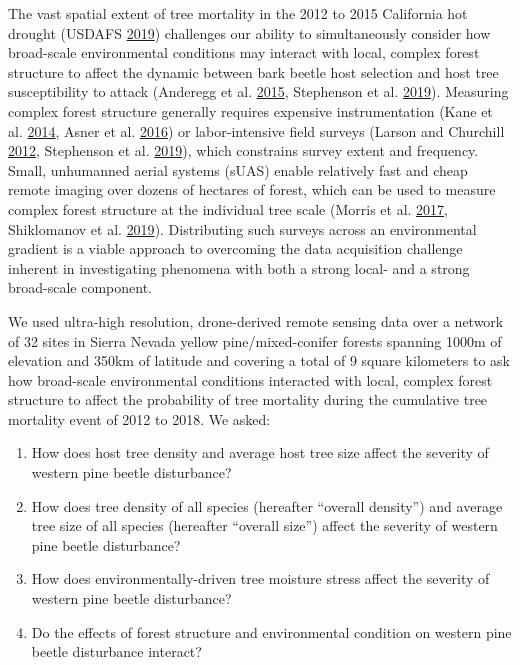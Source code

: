 \documentclass[twoside,12pt,final]{ucthesis-CA2012}
\begin{document}
\begin{ucmainmatter}
The vast spatial extent of tree mortality in the 2012 to 2015 California
hot drought (USDAFS \protect\hyperlink{ref-usdafs2019}{2019}) challenges
our ability to simultaneously consider how broad-scale environmental
conditions may interact with local, complex forest structure to affect
the dynamic between bark beetle host selection and host tree
susceptibility to attack (Anderegg et al.
\protect\hyperlink{ref-anderegg2015a}{2015}, Stephenson et al.
\protect\hyperlink{ref-stephenson2019}{2019}). Measuring complex forest
structure generally requires expensive instrumentation (Kane et al.
\protect\hyperlink{ref-kane2014}{2014}, Asner et al.
\protect\hyperlink{ref-asner2016}{2016}) or labor-intensive field
surveys (Larson and Churchill \protect\hyperlink{ref-larson2012}{2012},
Stephenson et al. \protect\hyperlink{ref-stephenson2019}{2019}), which
constrains survey extent and frequency. Small, unhumanned aerial systems
(sUAS) enable relatively fast and cheap remote imaging over dozens of
hectares of forest, which can be used to measure complex forest
structure at the individual tree scale (Morris et al.
\protect\hyperlink{ref-morris2017}{2017}, Shiklomanov et al.
\protect\hyperlink{ref-shiklomanov2019}{2019}). Distributing such
surveys across an environmental gradient is a viable approach to
overcoming the data acquisition challenge inherent in investigating
phenomena with both a strong local- and a strong broad-scale component.

We used ultra-high resolution, drone-derived remote sensing data over a
network of 32 sites in Sierra Nevada yellow pine/mixed-conifer forests
spanning 1000m of elevation and 350km of latitude and covering a total
of 9 square kilometers to ask how broad-scale environmental conditions
interacted with local, complex forest structure to affect the
probability of tree mortality during the cumulative tree mortality event
of 2012 to 2018. We asked:
\begin{enumerate}
\def\labelenumi{\arabic{enumi}.}
\item
  How does host tree density and average host tree size affect the
  severity of western pine beetle disturbance?
\item
  How does tree density of all species (hereafter ``overall density'')
  and average tree size of all species (hereafter ``overall size'')
  affect the severity of western pine beetle disturbance?
\item
  How does environmentally-driven tree moisture stress affect the
  severity of western pine beetle disturbance?
\item
  Do the effects of forest structure and environmental condition on
  western pine beetle disturbance interact?
\end{enumerate}

\end{ucmainmatter}
\end{document}
